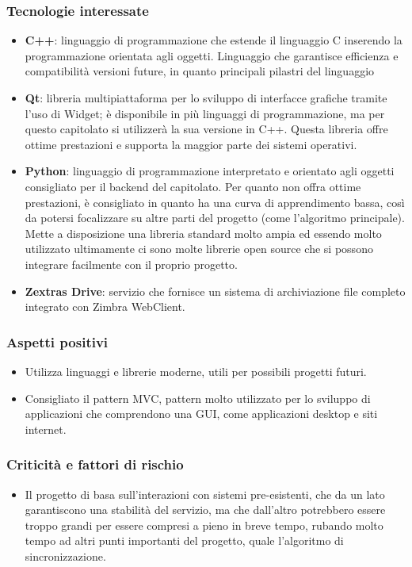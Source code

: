 		\subsubsection{Tecnologie interessate}
			\begin{itemize}
				\item\textbf{C++}: linguaggio di programmazione che estende il linguaggio C inserendo la programmazione orientata agli oggetti. Linguaggio che garantisce efficienza e compatibilità versioni future, in quanto principali pilastri del linguaggio
				\item\textbf{Qt}:  libreria multipiattaforma per lo sviluppo di interfacce grafiche tramite l’uso di Widget; è disponibile in più linguaggi di programmazione, ma per questo capitolato si utilizzerà la sua versione in C++. Questa libreria offre ottime prestazioni e supporta la maggior parte dei sistemi operativi.
				\item\textbf{Python}: linguaggio di programmazione interpretato e orientato agli oggetti consigliato per il backend del capitolato. Per quanto non offra ottime prestazioni, è consigliato in quanto ha una curva di apprendimento bassa, così da potersi focalizzare su altre parti del progetto (come l’algoritmo principale). Mette a disposizione una libreria standard molto ampia ed essendo molto utilizzato ultimamente ci sono molte librerie open source che si possono integrare facilmente con il proprio progetto.
				\item\textbf{Zextras Drive}: servizio che fornisce un sistema di archiviazione file completo integrato con Zimbra WebClient.
			\end{itemize}
			
		\subsubsection{Aspetti positivi}
			\begin{itemize}
				\item Utilizza linguaggi e librerie moderne, utili per possibili progetti futuri.
				\item Consigliato il pattern MVC, pattern molto utilizzato per lo sviluppo di applicazioni che comprendono una GUI, come applicazioni desktop e siti internet.
 			\end{itemize}			
		\subsubsection{Criticità e fattori di rischio}
			\begin{itemize}
				\item Il progetto di basa sull’interazioni con sistemi pre-esistenti, che da un lato garantiscono una stabilità del servizio, ma che dall’altro potrebbero essere troppo grandi per essere compresi a pieno in breve tempo, rubando molto tempo ad altri punti importanti del progetto, quale l’algoritmo di sincronizzazione.
			\end{itemize}
